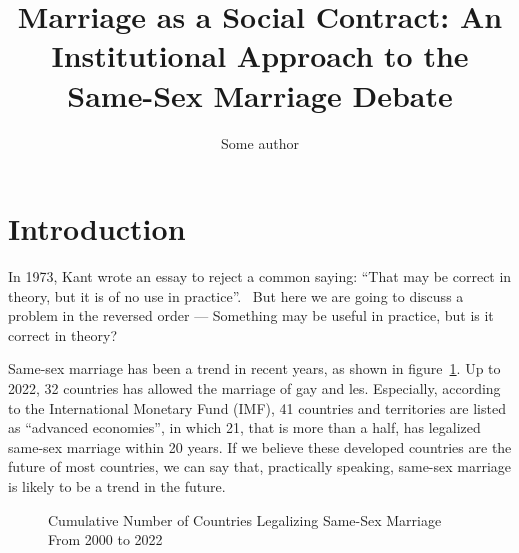 \documentclass[man,floatsintext]{apa7}
\title{Marriage as a Social Contract: An Institutional Approach to the Same-Sex Marriage Debate}
\author{Some author}
\begin{document}
\maketitle{}
\tableofcontents

\newpage

\section{Introduction}
In 1973, Kant wrote an essay to reject a common saying: ``That may be correct in theory, but it is of no use in practice''.~\autocite{kantCommonSayingThat2009} But here we are going to discuss a problem in the reversed order --- Something may be useful in practice, but is it correct in theory? 

Same-sex marriage has been a trend in recent years, as shown in figure~\ref{Cumu}. Up to 2022, 32 countries has allowed the marriage of gay and les. Especially, according to the International Monetary Fund (IMF), 41 countries and territories are listed as ``advanced economies'', in which 21, that is more than a half, has legalized same-sex marriage within 20 years. If we believe these developed countries are the future of most countries, we can say that, practically speaking, same-sex marriage is likely to be a trend in the future.


\begin{figure}[H]
    \centering
        
    \caption{Cumulative Number of Countries Legalizing Same-Sex Marriage From 2000 to 2022~\autocite{perper32CountriesWorld2022}}
    \label{Cumu}
\end{figure}
    
\end{document}
